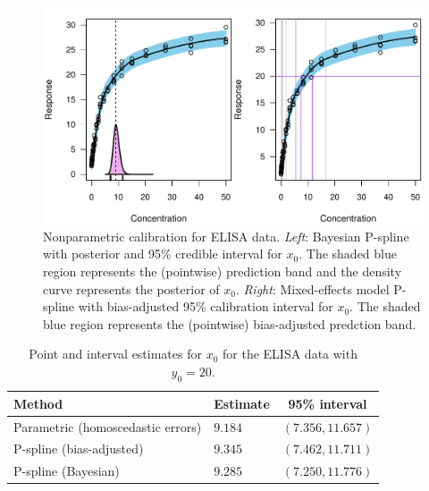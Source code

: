 \documentclass[cmfont,usenames,dvipsnames,leqno]{afit-etd}\usepackage[]{graphicx}\usepackage[]{color}
\makeatletter
\def\maxwidth{ %
  \ifdim\Gin@nat@width>\linewidth
    \linewidth
  \else
    \Gin@nat@width
  \fi
}
\newenvironment{knitrout}{}{} %
\renewenvironment{knitrout}{\begin{singlespace}}{\end{singlespace}}
\makeatother
\begin{document}
\begin{knitrout}
\color{fgcolor}\begin{figure}[H]

\includegraphics[width=\maxwidth]{figure/elisa-jags} \caption[Bayesian nonparametric calibration for ELISA data]{Nonparametric calibration for ELISA data. \textit{Left}: Bayesian \ac{P-spline} with posterior and 95\% credible interval for $x_0$. The shaded blue region represents the (pointwise) prediction band and the density curve represents the posterior of $x_0$. \textit{Right}: Mixed-effects model \ac{P-spline} with bias-adjusted 95\% calibration interval for $x_0$. The shaded blue region represents the (pointwise) bias-adjusted predction band.\label{fig:elisa-jags}}
\end{figure}


\end{knitrout}


\begin{table}[H]
\label{tab:elisa}
\centering
\begin{tabular}{llc}
  \toprule
  \textbf{Method} & \textbf{Estimate} & \textbf{95\% interval} \\
  \midrule
  Parametric (homoscedastic errors)   & $9.184$ & $(7.356, 11.657)$ \\
  \ac{P-spline} (bias-adjusted)            & $9.345$ & $(7.462, 11.711)$ \\
  \ac{P-spline} (Bayesian)                 & $9.285$ & $(7.250, 11.776)$ \\
  \bottomrule
\end{tabular}
\caption[Calibration results for the ELISA data]{Point and interval estimates for $x_0$ for the ELISA data with $y_0 = 20$.}
\end{table}
\end{document}
